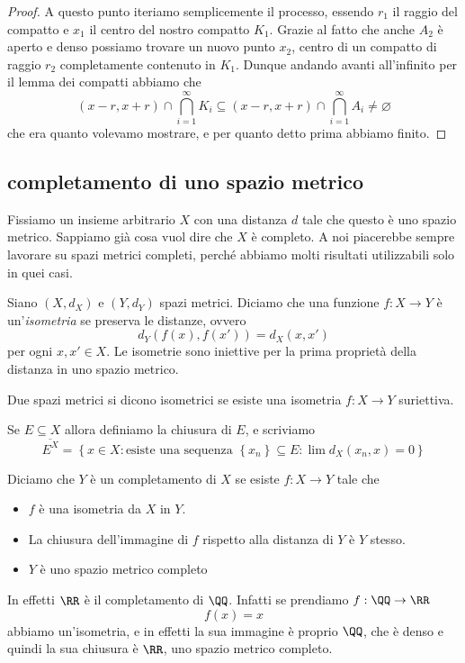 \documentclass[11pt]{scrartcl}
\newcommand{\eset}{\varnothing}
\begin{document}
\begin{proof}
 		A questo punto iteriamo semplicemente il processo, essendo $r_1$ il raggio del compatto e $x_1$ il centro del nostro compatto $K_1$. Grazie al fatto che anche $A_2$ è aperto e denso possiamo trovare un nuovo punto $x_2$, centro di un compatto di raggio $r_2$ completamente contenuto in $K_1$. Dunque andando avanti all'infinito per il lemma dei compatti abbiamo che
 		$$(x-r,x+r)\cap\bigcap_{i=1}^\infty K_i\subseteq (x-r,x+r) \cap \bigcap_{i=1}^\infty A_i \ne\eset$$
 		che era quanto volevamo mostrare, e per quanto detto prima abbiamo finito.
 	\end{proof}
 	\subsection{completamento di uno spazio metrico}
 	Fissiamo un insieme arbitrario $X$ con una distanza $d$ tale che questo è uno spazio metrico. Sappiamo già cosa vuol dire che $X$ è completo. A noi piacerebbe sempre lavorare su spazi metrici completi, perché abbiamo molti risultati utilizzabili solo in quei casi.
 	\begin{definition}[Isometria]
 		Siano $(X,d_X)$ e $(Y,d_Y)$ spazi metrici. Diciamo che una funzione $f:X\to Y$ è un'\textit{isometria} se preserva le distanze, ovvero
 		$$d_Y(f(x),f(x'))=d_X(x,x')$$
 		per ogni $x,x'\in X$. Le isometrie sono iniettive per la prima proprietà della distanza in uno spazio metrico.
 	\end{definition}
 	\begin{definition}
 		Due spazi metrici si dicono isometrici se esiste una isometria $f:X\to Y$ suriettiva.
 	\end{definition}
 	\begin{definition}[Chiusura]
 		Se $E\subseteq X$ allora definiamo la chiusura di $E$, e scriviamo
 		$$\overline{E^X}=\left\{x\in X:\text{esiste una sequenza }\left\{x_n\right\}\subseteq E: \lim d_X(x_n,x) = 0\right\}$$
 	\end{definition}
 	\begin{definition}
 		Diciamo che $Y$ è un completamento di $X$ se esiste $f:X\to Y$ tale che
 		\begin{itemize}
 			\item $f$ è una isometria da $X$ in $Y$.
 			\item La chiusura dell'immagine di $f$ rispetto alla distanza di $Y$ è $Y$ stesso.
 			\item $Y$ è uno spazio metrico completo
 		\end{itemize}
 	\end{definition}
 	\begin{remark}
 		In effetti $\RR$ è il completamento di $\QQ$. Infatti se prendiamo $f:\QQ\to\RR$
 		$$f(x)=x$$
 		abbiamo un'isometria, e in effetti la sua immagine è proprio $\QQ$, che è denso e quindi la sua chiusura è $\RR$, uno spazio metrico completo.
  	\end{remark}
  	
\end{document}
